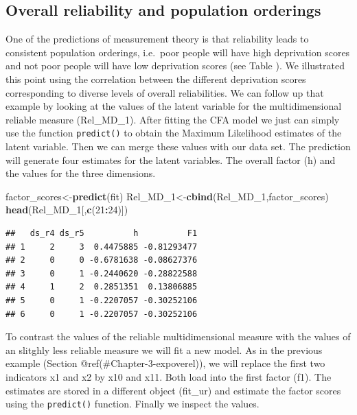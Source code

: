 \documentclass[]{book}
\newenvironment{Shaded}{\begin{snugshade}}{\end{snugshade}}
\newcommand{\DecValTok}[1]{\textcolor[rgb]{0.00,0.00,0.81}{#1}}
\newcommand{\KeywordTok}[1]{\textcolor[rgb]{0.13,0.29,0.53}{\textbf{#1}}}
\newcommand{\NormalTok}[1]{#1}
\newcommand{\OperatorTok}[1]{\textcolor[rgb]{0.81,0.36,0.00}{\textbf{#1}}}
\begin{document}
\hypertarget{overall-reliability-and-population-orderings}{%
\subsection{Overall reliability and population orderings}\label{overall-reliability-and-population-orderings}}

One of the predictions of measurement theory is that reliability leads to consistent population orderings, i.e.~poor people will have high deprivation scores and not poor people will have low deprivation scores (see Table \label{tab:relentropy}). We illustrated this point using the correlation between the different deprivation scores corresponding to diverse levels of overall reliabilities. We can follow up that example by looking at the values of the latent variable for the multidimensional reliable measure (Rel\_MD\_1). After fitting the CFA model we just can simply use the function \texttt{predict()} to obtain the Maximum Likelihood estimates of the latent variable. Then we can merge these values with our data set. The prediction will generate four estimates for the latent variables. The overall factor (h) and the values for the three dimensions.

\begin{Shaded}
\begin{Highlighting}[]
\NormalTok{factor_scores<-}\KeywordTok{predict}\NormalTok{(fit)}
\NormalTok{Rel_MD_}\DecValTok{1}\NormalTok{<-}\KeywordTok{cbind}\NormalTok{(Rel_MD_}\DecValTok{1}\NormalTok{,factor_scores)}
\KeywordTok{head}\NormalTok{(Rel_MD_}\DecValTok{1}\NormalTok{[,}\KeywordTok{c}\NormalTok{(}\DecValTok{21}\OperatorTok{:}\DecValTok{24}\NormalTok{)])}
\end{Highlighting}
\end{Shaded}

\begin{verbatim}
##   ds_r4 ds_r5          h          F1
## 1     2     3  0.4475885 -0.81293477
## 2     0     0 -0.6781638 -0.08627376
## 3     0     1 -0.2440620 -0.28822588
## 4     1     2  0.2851351  0.13806885
## 5     0     1 -0.2207057 -0.30252106
## 6     0     1 -0.2207057 -0.30252106
\end{verbatim}

To contrast the values of the reliable multidimensional measure with the values of an slitghly less reliable measure we will fit a new model. As in the previous example (Section @ref(\#Chapter-3-expoverel)), we will replace the first two indicators x1 and x2 by x10 and x11. Both load into the first factor (f1). The estimates are stored in a different object (fit\_ur) and estimate the factor scores using the \texttt{predict()} function. Finally we inspect the values.
\end{document}
